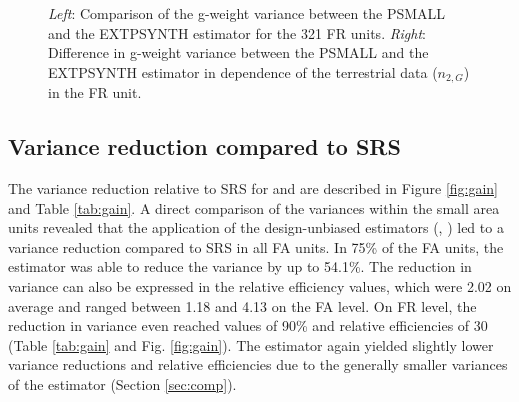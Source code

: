\begin{figure}[H]
	\centering
	\caption{\textit{Left}: Comparison of the g-weight variance between the PSMALL and the EXTPSYNTH estimator for the 321 FR units.
		\textit{Right}: Difference in g-weight variance between the PSMALL and the EXTPSYNTH estimator in dependence of the terrestrial data ($n_{2,G}$) in the FR unit.}
	\label{fig:compvar}
\end{figure}




\subsection{Variance reduction compared to SRS}
\label{sec:gain_eval}

The variance reduction relative to SRS for \psmall{} and \extpsynth{} are described in Figure \ref{fig:gain} and Table \ref{tab:gain}. A direct comparison of the variances within the small area units revealed that the application of the design-unbiased estimators (\psmall{}, \extpsynth{}) led to a variance reduction compared to SRS in all FA units. In 75\% of the FA units, the \extpsynth{} estimator was able to reduce the variance by up to 54.1\%. The reduction in variance can also be expressed in the relative efficiency values, which were 2.02 on average and ranged between 1.18 and 4.13 on the FA level. On FR level, the reduction in variance even reached values of 90\% and relative efficiencies of 30 (Table \ref{tab:gain} and Fig. \ref{fig:gain}). The \psmall{} estimator again yielded slightly lower variance reductions and relative efficiencies due to the generally smaller variances of the \extpsynth{} estimator (Section \ref{sec:comp}).

